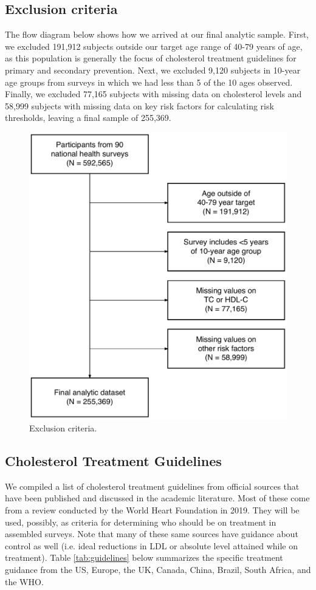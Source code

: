 \documentclass[12pt]{article}
\begin{document}
\begin{appendix}
    \subsection{Exclusion criteria}
    The flow diagram below shows how we arrived at our final analytic sample. First, we excluded 191,912 subjects outside our target age range of 40-79 years of age, as this population is generally the focus of cholesterol treatment guidelines for primary and secondary prevention. Next, we excluded 9,120 subjects in 10-year age groups from surveys in which we had less than 5 of the 10 ages observed. Finally, we excluded 77,165 subjects with missing data on cholesterol levels and 58,999 subjects with missing data on key risk factors for calculating risk thresholds, leaving a final sample of 255,369.
    \begin{figure}[H]
        \centering
        \includegraphics[width=0.5\linewidth]{../3_figures/figS_STROBE.pdf}
        \caption{Exclusion criteria.}
        \label{fig:exclusion}
    \end{figure}

    \subsection{Cholesterol Treatment Guidelines}

    We compiled a list of cholesterol treatment guidelines from official sources that have been published and discussed in the academic literature. Most of these come from a review conducted by the World Heart Foundation in 2019. They will be used, possibly, as criteria for determining who should be on treatment in assembled surveys. Note that many of these same sources have guidance about control as well (i.e. ideal reductions in LDL or absolute level attained while on treatment). Table \ref{tab:guidelines} below summarizes the specific treatment guidance from the US, Europe, the UK, Canada, China, Brazil, South Africa, and the WHO. 


\end{appendix}
\end{document}
